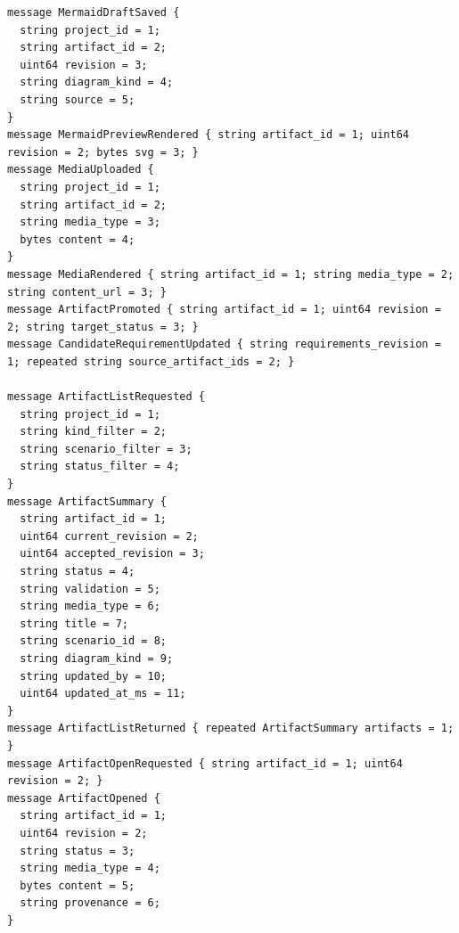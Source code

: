 \begin{lstlisting}[language={},basicstyle=\ttfamily\tiny,breaklines=true]
message MermaidDraftSaved {
  string project_id = 1;
  string artifact_id = 2;
  uint64 revision = 3;
  string diagram_kind = 4;
  string source = 5;
}
message MermaidPreviewRendered { string artifact_id = 1; uint64 revision = 2; bytes svg = 3; }
message MediaUploaded {
  string project_id = 1;
  string artifact_id = 2;
  string media_type = 3;
  bytes content = 4;
}
message MediaRendered { string artifact_id = 1; string media_type = 2; string content_url = 3; }
message ArtifactPromoted { string artifact_id = 1; uint64 revision = 2; string target_status = 3; }
message CandidateRequirementUpdated { string requirements_revision = 1; repeated string source_artifact_ids = 2; }

message ArtifactListRequested {
  string project_id = 1;
  string kind_filter = 2;
  string scenario_filter = 3;
  string status_filter = 4;
}
message ArtifactSummary {
  string artifact_id = 1;
  uint64 current_revision = 2;
  uint64 accepted_revision = 3;
  string status = 4;
  string validation = 5;
  string media_type = 6;
  string title = 7;
  string scenario_id = 8;
  string diagram_kind = 9;
  string updated_by = 10;
  uint64 updated_at_ms = 11;
}
message ArtifactListReturned { repeated ArtifactSummary artifacts = 1; }
message ArtifactOpenRequested { string artifact_id = 1; uint64 revision = 2; }
message ArtifactOpened {
  string artifact_id = 1;
  uint64 revision = 2;
  string status = 3;
  string media_type = 4;
  bytes content = 5;
  string provenance = 6;
}
\end{lstlisting}
